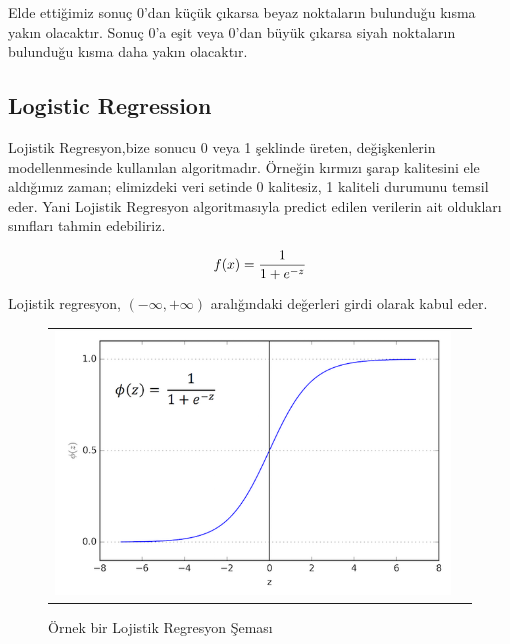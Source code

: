 \documentclass[conference]{IEEEtran}
\begin{document}
\quad Elde ettiğimiz sonuç 0’dan küçük çıkarsa beyaz noktaların bulunduğu kısma yakın olacaktır. Sonuç 0’a eşit veya 0’dan büyük çıkarsa siyah noktaların bulunduğu kısma daha yakın olacaktır\cite{12}.
\pagebreak
\subsection{\textbf{Logistic Regression}}

\quad Lojistik Regresyon,bize sonucu 0 veya 1 şeklinde üreten, değişkenlerin modellenmesinde kullanılan algoritmadır. Örneğin kırmızı şarap kalitesini ele aldığımız zaman; elimizdeki veri setinde 0 kalitesiz, 1 kaliteli durumunu temsil eder. Yani Lojistik Regresyon algoritmasıyla predict edilen verilerin ait oldukları sınıfları tahmin edebiliriz\cite{13}.

\begin{equation}
\label{eq:03}
\Large f(x)=\frac{1}{1+e^{-z}}
\end{equation}

Lojistik regresyon, $\left(-\infty,+\infty \right)$ aralığındaki değerleri girdi olarak kabul eder\cite{13}.

\begin{figure}[!h]
	\centering%
	\begin{center}
		\begin{tabular}{cc}%
			\includegraphics[scale=0.3]{pictures/pic_04.png}&%
		\end{tabular}%
	\end{center}
	\caption{Örnek bir Lojistik Regresyon Şeması\cite{13}}%
	\label{fig:04}
\end{figure}
\end{document}
